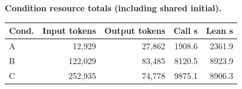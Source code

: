 \begin{center}
\textbf{Condition resource totals (including shared initial).}\par\vspace{3pt}
\small
\begin{tabular}{lrrrr}
\toprule
Cond. & Input tokens & Output tokens & Call s & Lean s \\
\midrule
A & 12,929 & 27,862 & 1908.6 & 2361.9 \\
B & 122,029 & 83,485 & 8120.5 & 8923.9 \\
C & 252,935 & 74,778 & 9875.1 & 8906.3 \\
\bottomrule
\end{tabular}
\end{center}
